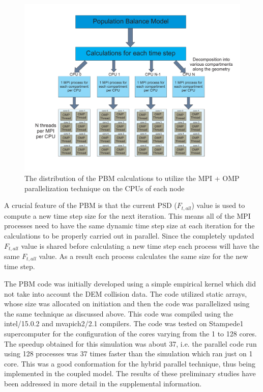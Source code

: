 \documentclass[preprint,11pt,authoryear]{elsarticle}
\begin{document}
\begin{figure}
\centering
\includegraphics[scale=0.45]{PBM_decomposition.pdf}
\caption{The distribution of the PBM calculations to utilize the MPI + OMP parallelization technique on the CPUs of each node}
\label{fig:mthds_PBM_decompostion}
\end{figure}

A crucial feature of the PBM is that the current PSD ($F_{t,all}$) value is used to compute a new 
time step size for the next iteration. This means all of the MPI processes need to have the same 
dynamic time step size at each iteration for the calculations to be properly carried out in parallel. Since 
the completely updated $F_{t,all}$ value is shared before calculating a new time step each process will 
have the same $F_{t,all}$ value. As a result each process calculates the same size for the new time 
step. 

The PBM code was initially developed using a simple empirical kernel which did 
not take into account the DEM collision data.
The code utilized static arrays, whose size was allocated on initiation and then the code was parallelized using the same
technique as discussed above. This code was compiled using the intel/15.0.2 and mvapich2/2.1 compilers. The code was tested on
Stampede1 supercomputer for the configuration of the cores varying from the 1 to 128 cores. The speedup obtained for this simulation 
was about 37, i.e. the parallel code run using 128 processes was 37 times faster than the simulation which ran just on 1 core.
This was a good conformation for the hybrid parallel technique, thus being implemented in the coupled model. The results of these 
preliminary studies have been addressed in more detail in the supplemental information.
\end{document}

